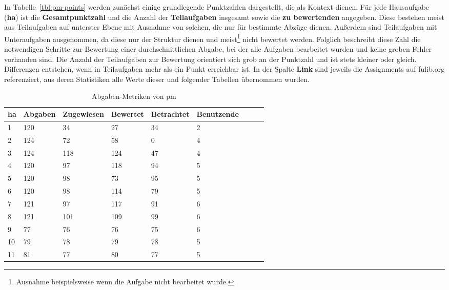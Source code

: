 In Tabelle~\ref{tbl:pm-points} werden zunächst einige grundlegende Punktzahlen dargestellt, die als Kontext dienen.
Für jede Hausaufgabe (\textbf{\acs{ha}}) ist die \textbf{Gesamtpunktzahl} und die Anzahl der \textbf{Teilaufgaben} insgesamt sowie die \textbf{zu bewertenden} angegeben.
Diese bestehen meist aus Teilaufgaben auf unterster Ebene mit Ausnahme von solchen, die nur für bestimmte Abzüge dienen.
Außerdem sind Teilaufgaben mit Unteraufgaben ausgenommen, da diese nur der Struktur dienen und meist\footnote{
    Ausnahme beispielsweise wenn die Aufgabe nicht bearbeitet wurde.
} nicht bewertet werden.
Folglich beschreibt diese Zahl die notwendigen Schritte zur Bewertung einer durchschnittlichen Abgabe, bei der alle Aufgaben bearbeitet wurden und keine groben Fehler vorhanden sind.
Die Anzahl der Teilaufgaben zur Bewertung orientiert sich grob an der Punktzahl und ist stets kleiner oder gleich.
Differenzen entstehen, wenn in Teilaufgaben mehr als ein Punkt erreichbar ist.
In der Spalte \textbf{Link} sind jeweils die Assignments auf fulib.org referenziert, aus deren Statistiken alle Werte dieser und folgender Tabellen übernommen wurden.

\begin{table}
    \centering
    \caption{Abgaben-Metriken von \ac{pm}}
    \begin{tabular}{|l|l|l|l|l|l|l|l|l|}
    \hline
        \acs{ha} & Abgaben & Zugewiesen & Bewertet & Betrachtet & Benutzende \\ \hline
        1  & 120 &  34 &  27 & 34 & 2  \\ \hline
        2  & 124 &  72 &  58 &  0 & 4  \\ \hline
        3  & 124 & 118 & 124 & 47 & 4  \\ \hline
        4  & 120 &  97 & 118 & 94 & 5  \\ \hline
        5  & 120 &  98 &  73 & 95 & 5  \\ \hline
        6  & 120 &  98 & 114 & 79 & 5  \\ \hline
        7  & 121 &  97 & 117 & 91 & 6  \\ \hline
        8  & 121 & 101 & 109 & 99 & 6  \\ \hline
        9  &  77 &  76 &  76 & 75 & 6  \\ \hline
        10 &  79 &  78 &  79 & 78 & 5  \\ \hline
        11 &  81 &  77 &  80 & 77 & 5  \\ \hline
    \end{tabular}
    \label{tbl:pm-solutions}
\end{table}

